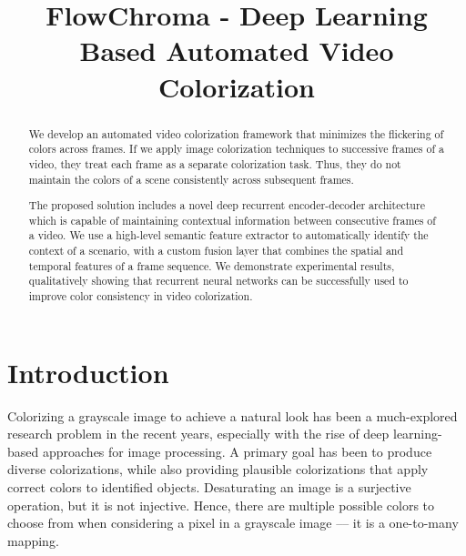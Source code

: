 \documentclass[10pt,twocolumn,letterpaper]{article}
\begin{document}
\title{FlowChroma - Deep Learning Based Automated Video Colorization}


\maketitle
\ifwacvfinal\thispagestyle{empty}\fi
\begin{abstract}
   We develop an automated video colorization framework that minimizes the flickering of colors across frames. If we apply image colorization techniques to successive frames of a video, they treat each frame as a separate colorization task. Thus, they do not maintain the colors of a scene consistently across subsequent frames.

The proposed solution includes a novel deep recurrent encoder-decoder architecture which is capable of maintaining contextual information between consecutive frames of a video. We use a high-level semantic feature extractor to automatically identify the context of a scenario, with a custom fusion layer that combines the spatial and temporal features of a frame sequence. We demonstrate experimental results, qualitatively showing that recurrent neural networks can be successfully used to improve color consistency in video colorization.
\end{abstract}

\section{Introduction}

Colorizing a grayscale image to achieve a natural look has been a much-explored research problem in the recent years, especially with the rise of deep learning-based approaches for image processing. A primary goal has been to produce diverse colorizations, while also providing plausible colorizations that apply correct colors to identified objects. Desaturating an image is a surjective operation, but it is not injective. Hence, there are multiple possible colors to choose from when considering a pixel in a grayscale image --– it is a one-to-many mapping.
\end{document}
